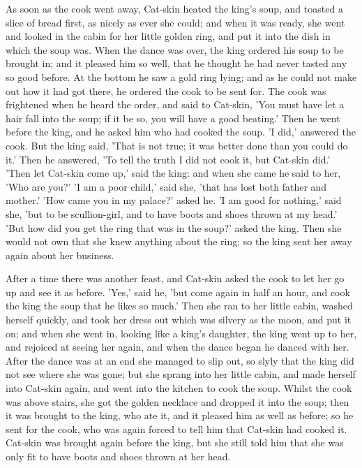 \documentclass[12pt]{book}
\begin{document}
As soon as the cook went away, Cat-skin heated the king's soup, and
toasted a slice of bread first, as nicely as ever she could; and when
it was ready, she went and looked in the cabin for her little golden
ring, and put it into the dish in which the soup was. When the dance
was over, the king ordered his soup to be brought in; and it pleased
him so well, that he thought he had never tasted any so good before.
At the bottom he saw a gold ring lying; and as he could not make out
how it had got there, he ordered the cook to be sent for. The cook was
frightened when he heard the order, and said to Cat-skin, 'You must
have let a hair fall into the soup; if it be so, you will have a good
beating.' Then he went before the king, and he asked him who had
cooked the soup. 'I did,' answered the cook. But the king said, 'That
is not true; it was better done than you could do it.' Then he
answered, 'To tell the truth I did not cook it, but Cat-skin did.'
'Then let Cat-skin come up,' said the king: and when she came he said
to her, 'Who are you?' 'I am a poor child,' said she, 'that has lost
both father and mother.' 'How came you in my palace?' asked he. 'I am
good for nothing,' said she, 'but to be scullion-girl, and to have
boots and shoes thrown at my head.' 'But how did you get the ring that
was in the soup?' asked the king. Then she would not own that she knew
anything about the ring; so the king sent her away again about her
business.

After a time there was another feast, and Cat-skin asked the cook to
let her go up and see it as before. 'Yes,' said he, 'but come again in
half an hour, and cook the king the soup that he likes so much.' Then
she ran to her little cabin, washed herself quickly, and took her
dress out which was silvery as the moon, and put it on; and when she
went in, looking like a king's daughter, the king went up to her, and
rejoiced at seeing her again, and when the dance began he danced with
her. After the dance was at an end she managed to slip out, so slyly
that the king did not see where she was gone; but she sprang into her
little cabin, and made herself into Cat-skin again, and went into the
kitchen to cook the soup. Whilst the cook was above stairs, she got
the golden necklace and dropped it into the soup; then it was brought
to the king, who ate it, and it pleased him as well as before; so he
sent for the cook, who was again forced to tell him that Cat-skin had
cooked it. Cat-skin was brought again before the king, but she still
told him that she was only fit to have boots and shoes thrown at her
head.
\end{document}
